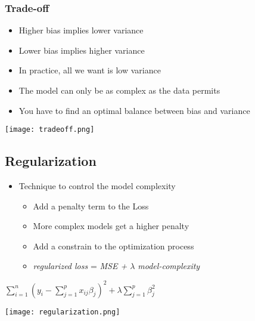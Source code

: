 \subsubsection{Trade-off}
\begin{itemize}
    \item Higher bias implies lower variance
    \item Lower bias implies higher variance
    \item In practice, all we want is low variance
    \item The model can only be as complex as the data permits
    \item You have to find an optimal balance between bias and variance
\end{itemize}
\texttt{[image: tradeoff.png]}

\subsection{Regularization}
\begin{itemize}
    \item Technique to control the model complexity
    \begin{itemize}
        \item Add a penalty term to the Loss
        \item More complex models get a higher penalty
        \item Add a constrain to the optimization process
        \item \textit{regularized loss} = \textit{MSE + $\lambda$ model-complexity}
    \end{itemize}
\end{itemize}
\begin{center}
    $\displaystyle\sum_{i = 1}^{n} (y_i - \displaystyle\sum_{j = 1}^{p} x_{ij}\beta_j)^2 + \lambda \displaystyle\sum_{j = 1}^{p}\beta_j^2$
\end{center}
\texttt{[image: regularization.png]}
